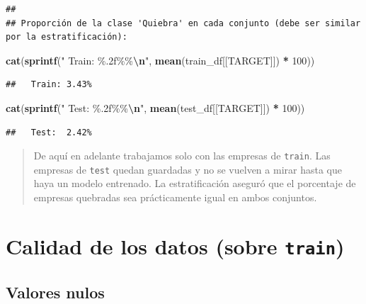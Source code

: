 \documentclass[
]{book}
\newenvironment{Shaded}{\begin{snugshade}}{\end{snugshade}}
\newcommand{\DecValTok}[1]{\textcolor[rgb]{0.00,0.00,0.81}{#1}}
\newcommand{\FunctionTok}[1]{\textcolor[rgb]{0.13,0.29,0.53}{\textbf{#1}}}
\newcommand{\NormalTok}[1]{#1}
\newcommand{\SpecialCharTok}[1]{\textcolor[rgb]{0.81,0.36,0.00}{\textbf{#1}}}
\newcommand{\StringTok}[1]{\textcolor[rgb]{0.31,0.60,0.02}{#1}}
\begin{document}
\begin{verbatim}
## 
## Proporción de la clase 'Quiebra' en cada conjunto (debe ser similar por la estratificación):
\end{verbatim}

\begin{Shaded}
\begin{Highlighting}[]
\FunctionTok{cat}\NormalTok{(}\FunctionTok{sprintf}\NormalTok{(}\StringTok{"  Train: \%.2f\%\%}\SpecialCharTok{\textbackslash{}n}\StringTok{"}\NormalTok{, }\FunctionTok{mean}\NormalTok{(train\_df[[TARGET]]) }\SpecialCharTok{*} \DecValTok{100}\NormalTok{))}
\end{Highlighting}
\end{Shaded}

\begin{verbatim}
##   Train: 3.43%
\end{verbatim}

\begin{Shaded}
\begin{Highlighting}[]
\FunctionTok{cat}\NormalTok{(}\FunctionTok{sprintf}\NormalTok{(}\StringTok{"  Test:  \%.2f\%\%}\SpecialCharTok{\textbackslash{}n}\StringTok{"}\NormalTok{, }\FunctionTok{mean}\NormalTok{(test\_df[[TARGET]]) }\SpecialCharTok{*} \DecValTok{100}\NormalTok{))}
\end{Highlighting}
\end{Shaded}

\begin{verbatim}
##   Test:  2.42%
\end{verbatim}

\begin{quote}
De aquí en adelante trabajamos solo con las empresas de \texttt{train}. Las empresas de
\texttt{test} quedan guardadas y no se vuelven a mirar hasta que haya un modelo entrenado.
La estratificación aseguró que el porcentaje de empresas quebradas sea prácticamente
igual en ambos conjuntos.
\end{quote}

\chapter{\texorpdfstring{Calidad de los datos (sobre \texttt{train})}{Calidad de los datos (sobre train)}}\label{calidad-de-los-datos-sobre-train}

\section{Valores nulos}\label{valores-nulos}
\end{document}
